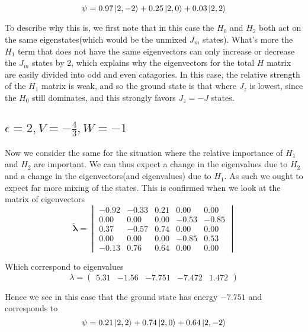 \documentclass[11pt]{article} %
\begin{document}
\begin{equation}
\psi=0.97 \ket{2,-2}+0.25 \ket{2,0}+0.03 \ket{2,2} \end{equation}

To describe why this is, we first note that in this case the $H_0$ and $H_2$ both act on the same eigenstates(which would be the unmixed $J_m$ states). What's more the $H_1$ term that does not have the same eigenvectors can only increase or decrease the $J_m$ states by 2, which explains why the eigenvectors for the total $H$ matrix are easily divided into odd and even catagories. In this case, the relative strength of the $H_1$ matrix is weak, and so the ground state is that where $J_z$ is lowest, since the $H_0$ still dominates, and this strongly favors $J_z=-J$ states. 

\subsection{ $\epsilon=2, V=-\frac{4}{3}, W=-1$}

Now we consider the same for the situation where the relative importance of $H_1$ and $H_2$ are important. We can thus expect a change in the eigenvalues due to $H_2$ and a change in the eigenvectors(and eigenvalues) due to $H_1$. As such we ought to expect far more mixing of the states. This is confirmed when we look at the matrix of eigenvectors\\

\begin{equation}\mathbf{\tilde{\lambda}}=\begin{vmatrix}-0.92 & -0.33 & 0.21 & 0.00 & 0.00 \\
0.00 & 0.00 & 0.00 & -0.53 & -0.85 \\
0.37 & -0.57 & 0.74 & 0.00 & 0.00 \\
0.00 & 0.00 & 0.00 & -0.85 & 0.53 \\
-0.13 & 0.76 & 0.64 & 0.00 & 0.00\end{vmatrix}\end{equation}

Which correspond to eigenvalues\\
\begin{equation}
\lambda=\begin{pmatrix} 5.31 & -1.56 & -7.751 & -7.472 &1.472 \end{pmatrix} \end{equation} 

Hence we see in this case that the ground state has energy $-7.751$ and corresponds to\\
\begin{equation} \psi=0.21 \ket{2,2} + 0.74 \ket{2,0}+0.64 \ket{2,-2} \end{equation}
\end{document}
